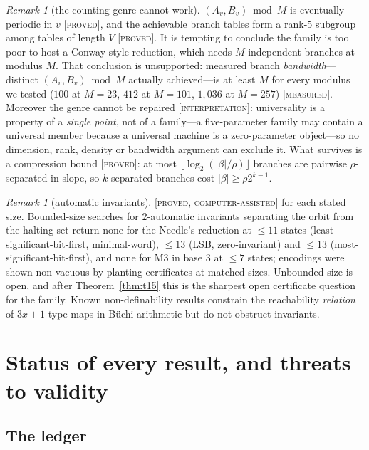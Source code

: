 \documentclass[11pt]{article}
\theoremstyle{definition}
\theoremstyle{remark}
\newtheorem{remark}[theorem]{Remark}
\newcommand{\Proved}{\textsc{[proved]}}
\newcommand{\CAP}{\textsc{[proved, computer-assisted]}}
\newcommand{\Meas}{\textsc{[measured]}}
\newcommand{\Interp}{\textsc{[interpretation]}}
\begin{document}
\begin{remark}[the counting genre cannot work]\label{rem:counting}
$(A_v,B_v)\bmod M$ is eventually periodic in $v$ \Proved{}, and the achievable
branch tables form a rank-$5$ subgroup among tables of length $V$ \Proved{}.
It is tempting to conclude the family is too poor to host a Conway-style
reduction, which needs $M$ independent branches at modulus $M$.  That
conclusion is unsupported: measured branch \emph{bandwidth}---distinct
$(A_v,B_v)\bmod M$ actually achieved---is at least $M$ for every modulus we
tested ($100$ at $M=23$, $412$ at $M=101$, $1{,}036$ at $M=257$) \Meas{}.
Moreover the genre cannot be repaired \Interp{}: universality is a property of
a \emph{single point}, not of a family---a five-parameter family may contain a
universal member because a universal machine is a zero-parameter object---so no
dimension, rank, density or bandwidth argument can exclude it.  What survives
is a compression bound \Proved{}: at most $\lfloor\log_2(|\beta|/\rho)\rfloor$
branches are pairwise $\rho$-separated in slope, so $k$ separated branches cost
$|\beta|\ge\rho2^{k-1}$.
\end{remark}

\begin{remark}[automatic invariants]\label{rem:automatic}
\CAP{} for each stated size.  Bounded-size searches for $2$-automatic
invariants separating the orbit from the halting set return none for the
Needle's reduction at $\le11$ states (least-significant-bit-first,
minimal-word), $\le13$ (LSB, zero-invariant) and $\le13$
(most-significant-bit-first), and none for M3 in base $3$ at $\le7$ states;
encodings were shown non-vacuous by planting certificates at matched sizes.
Unbounded size is open, and after Theorem~\ref{thm:t15} this is the sharpest
open certificate question for the family.  Known non-definability results
\cite{dhiman-pandey} constrain the reachability \emph{relation} of
$3x{+}1$-type maps in B\"uchi arithmetic but do not obstruct invariants.
\end{remark}

\section{Status of every result, and threats to validity}
\label{sec:ledger}

\subsection{The ledger}
\end{document}
